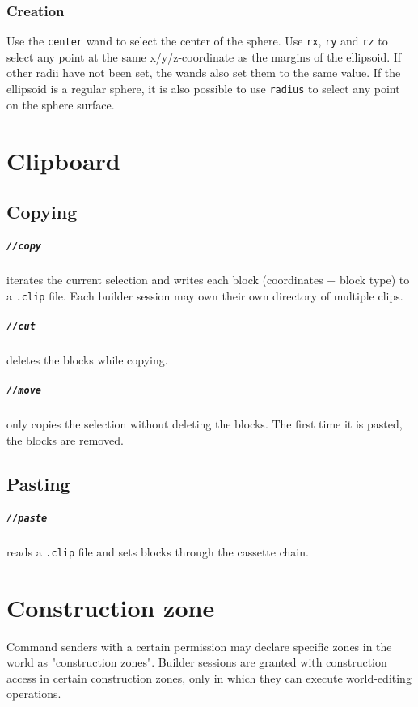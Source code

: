 \documentclass{report}
\begin{document}
				\subsection{Creation} Use the \texttt{center} wand to select the center of the sphere. Use
				\texttt{rx}, \texttt{ry} and \texttt{rz} to select any point at the same x/y/z-coordinate as the margins
				of the ellipsoid. If other radii have not been set, the wands also set them to the same value. If the
				ellipsoid is a regular sphere, it is also possible to use \texttt{radius} to select any point on the
				sphere surface.

		\chapter{Clipboard}
			\label{sec:clipboard}
			\section{Copying}
				\paragraph{\texttt{//copy}} iterates the current selection and writes each block (coordinates + block
				type) to a \texttt{.clip} file. Each builder session may own their own directory of multiple clips.
				\paragraph{\texttt{//cut}} deletes the blocks while copying.
				\paragraph{\texttt{//move}} only copies the selection without deleting the blocks. The first time it is
				pasted, the blocks are removed.
			\section{Pasting}
				\paragraph{\texttt{//paste}} reads a \texttt{.clip} file and sets blocks through the cassette chain.
		\chapter{Construction zone}
			Command senders with a certain permission may declare specific zones in the world as "construction zones".
			Builder sessions are granted with construction access in certain construction zones, only in which they can
			execute world-editing operations.
\end{document}
